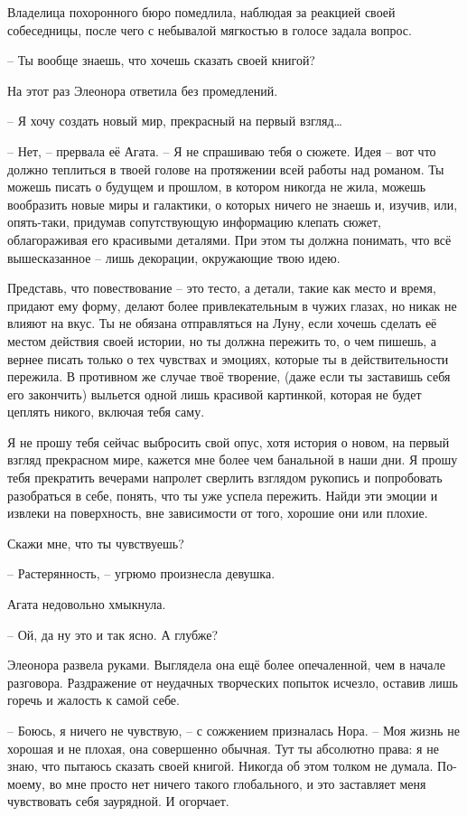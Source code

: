 \documentclass[
  a5paperpaper,
  DIV=11,
  numbers=noendperiod]{scrreprt}
\begin{document}
Владелица похоронного бюро помедлила, наблюдая за реакцией своей
собеседницы, после чего с небывалой мягкостью в голосе задала вопрос.

-- Ты вообще знаешь, что хочешь сказать своей книгой?

На этот раз Элеонора ответила без промедлений.

-- Я хочу создать новый мир, прекрасный на первый взгляд\ldots{}

-- Нет, -- прервала её Агата. -- Я не спрашиваю тебя о сюжете. Идея --
вот что должно теплиться в твоей голове на протяжении всей работы над
романом. Ты можешь писать о будущем и прошлом, в котором никогда не
жила, можешь вообразить новые миры и галактики, о которых ничего не
знаешь и, изучив, или, опять-таки, придумав сопутствующую информацию
клепать сюжет, облагораживая его красивыми деталями. При этом ты должна
понимать, что всё вышесказанное -- лишь декорации, окружающие твою идею.

Представь, что повествование -- это тесто, а детали, такие как место и
время, придают ему форму, делают более привлекательным в чужих глазах,
но никак не влияют на вкус. Ты не обязана отправляться на Луну, если
хочешь сделать её местом действия своей истории, но ты должна пережить
то, о чем пишешь, а вернее писать только о тех чувствах и эмоциях,
которые ты в действительности пережила. В противном же случае твоё
творение, (даже если ты заставишь себя его закончить) выльется одной
лишь красивой картинкой, которая не будет цеплять никого, включая тебя
саму.

Я не прошу тебя сейчас выбросить свой опус, хотя история о новом, на
первый взгляд прекрасном мире, кажется мне более чем банальной в наши
дни. Я прошу тебя прекратить вечерами напролет сверлить взглядом
рукопись и попробовать разобраться в себе, понять, что ты уже успела
пережить. Найди эти эмоции и извлеки на поверхность, вне зависимости от
того, хорошие они или плохие.

Скажи мне, что ты чувствуешь?

-- Растерянность, -- угрюмо произнесла девушка.

Агата недовольно хмыкнула.

-- Ой, да ну это и так ясно. А глубже?

Элеонора развела руками. Выглядела она ещё более опечаленной, чем в
начале разговора. Раздражение от неудачных творческих попыток исчезло,
оставив лишь горечь и жалость к самой себе.

-- Боюсь, я ничего не чувствую, -- с сожжением призналась Нора. -- Моя
жизнь не хорошая и не плохая, она совершенно обычная. Тут ты абсолютно
права: я не знаю, что пытаюсь сказать своей книгой. Никогда об этом
толком не думала. По-моему, во мне просто нет ничего такого глобального,
и это заставляет меня чувствовать себя заурядной. И огорчает.
\end{document}
